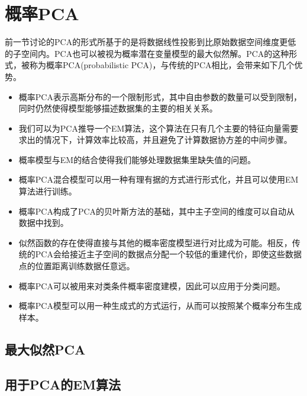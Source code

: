 \section{概率PCA}
前一节讨论的PCA的形式所基于的是将数据线性投影到比原始数据空间维度更低的子空间内。PCA也可以被视为概率潜在变量模型的最大似然解。PCA的这种形式，被称为概率PCA(probabilistic PCA)，与传统的PCA相比，会带来如下几个优势。
\begin{itemize}
	\item 概率PCA表示高斯分布的一个限制形式，其中自由参数的数量可以受到限制，同时仍然使得模型能够描述数据集的主要的相关关系。
	\item 我们可以为PCA推导一个EM算法，这个算法在只有几个主要的特征向量需要求出的情况下，计算效率比较高，并且避免了计算数据协方差的中间步骤。
	\item 概率模型与EM的结合使得我们能够处理数据集里缺失值的问题。
	\item 概率PCA混合模型可以用一种有理有据的方式进行形式化，并且可以使用EM算法进行训练。
	\item 概率PCA构成了PCA的贝叶斯方法的基础，其中主子空间的维度可以自动从数据中找到。
	\item 似然函数的存在使得直接与其他的概率密度模型进行对比成为可能。相反，传统的PCA会给接近主子空间的数据点分配一个较低的重建代价，即使这些数据点的位置距离训练数据任意远。
	\item 概率PCA可以被用来对类条件概率密度建模，因此可以应用于分类问题。
	\item 概率PCA模型可以用一种生成式的方式运行，从而可以按照某个概率分布生成样本。
\end{itemize}
\subsection*{最大似然PCA}
\subsection*{用于PCA的EM算法}
